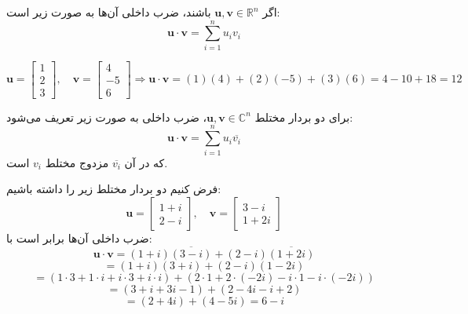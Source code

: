 \begin{definition}
اگر $\mathbf{u}, \mathbf{v} \in \mathbb{R}^n$ باشند، ضرب داخلی آن‌ها به صورت زیر است:
\[ \mathbf{u} \cdot \mathbf{v} = \sum_{i=1}^{n} u_i v_i \]
\begin{example}
	\[ \mathbf{u} = \begin{bmatrix} 1 \\ 2 \\ 3 \end{bmatrix}, \quad \mathbf{v} = \begin{bmatrix} 4 \\ -5 \\ 6 \end{bmatrix} \Rightarrow \mathbf{u} \cdot \mathbf{v} = (1)(4) + (2)(-5) + (3)(6) = 4 - 10 + 18 = 12 \]
\end{example}
\end{definition}
\begin{definition}
برای دو بردار مختلط $\mathbf{u}, \mathbf{v} \in \mathbb{C}^n$، ضرب داخلی به صورت زیر تعریف می‌شود:
\[
\mathbf{u} \cdot \mathbf{v} = \sum_{i=1}^{n} u_i \overline{v_i}
\]
که در آن $\overline{v_i}$ مزدوج مختلط $v_i$ است.
\begin{example}
	فرض کنیم دو بردار مختلط زیر را داشته باشیم:
	\[
	\mathbf{u} = \begin{bmatrix} 1 + i \\ 2 - i \end{bmatrix}, \quad
	\mathbf{v} = \begin{bmatrix} 3 - i \\ 1 + 2i \end{bmatrix}
	\]
	ضرب داخلی آن‌ها برابر است با:
	\[
	\mathbf{u} \cdot \mathbf{v} = (1 + i) \overline{(3 - i)} + (2 - i) \overline{(1 + 2i)}
	\]
	\[
	= (1 + i)(3 + i) + (2 - i)(1 - 2i)
	\]
	\[
	= (1 \cdot 3 + 1 \cdot i + i \cdot 3 + i \cdot i) + (2 \cdot 1 + 2 \cdot (-2i) - i \cdot 1 - i \cdot (-2i))
	\]
	\[
	= (3 + i + 3i - 1) + (2 - 4i - i + 2)
	\]
	\[
	= (2 + 4i) + (4 - 5i) = 6 - i
	\]
\end{example}
\end{definition}
